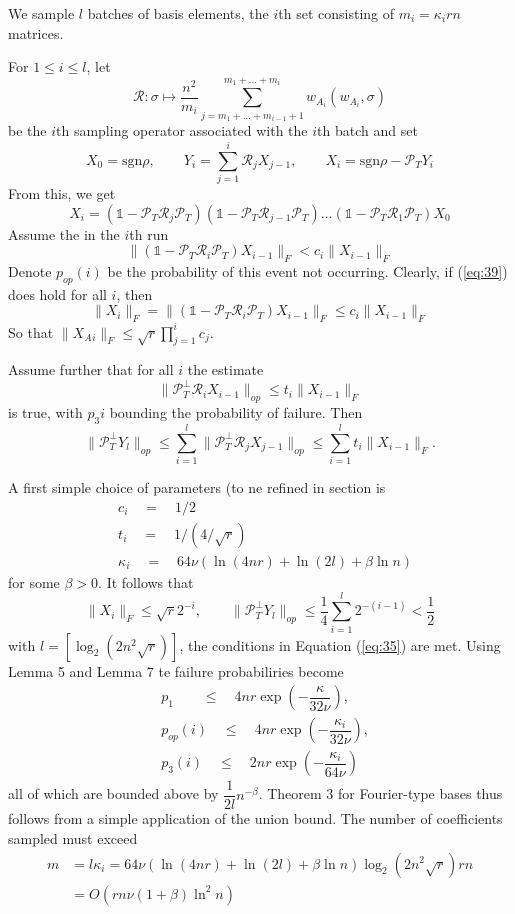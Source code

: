 \documentclass{article}
\begin{document}
We sample $l$ batches of basis elements, the $i$th set consisting of $m_i=\kappa_i rn$ matrices.

For $1\le i \le l$, let
\[
\mathcal{R}: \sigma \mapsto \dfrac{n^2}{m_i}\sum_{j=m_1+\dots+m_{i-1}+1}^{m_1+\dots+m_i} w_{A_i}( w_{A_i},\sigma)
\]
be the $i$th sampling operator associated with the $i$th batch and set
\[
X_0 = \text{sgn}\rho, \qquad Y_i = \sum_{j=1}^i\mathcal{R}_j X_{j-1}, \qquad X_i = \text{sgn}\rho - \mathcal{P}_TY_i
\]
From this, we get
\begin{equation}
X_i = (\mathbb{1}-\mathcal{P}_T\mathcal{R}_j\mathcal{P}_T)(\mathbb{1}-\mathcal{P}_T\mathcal{R}_{j-1}\mathcal{P}_T)\dots(\mathbb{1}-\mathcal{P}_T\mathcal{R}_1\mathcal{P}_T)X_0
\end{equation}
Assume the in the $i$th run
\begin{equation}
\| (\mathbb{1}-\mathcal{P}_T\mathcal{R}_i\mathcal{P}_T) X_{i-1}\|_F < c_i\|X_{i-1}\|_F
\label{eq:39}
\end{equation}
Denote $p_{op}(i)$ be the probability of this event not occurring. Clearly, if (\ref{eq:39}) does hold for all $i$, then
\[
\|X_i\|_F = \|(\mathbb{1}-\mathcal{P}_T\mathcal{R}_i\mathcal{P}_T) X_{i-1}\|_F \le c_i\|X_{i-1}\|_F
\]
So that $\|X_A{_i}\|_F \le \sqrt{r}\prod_{j=1}^i c_j$.

Assume further that for all $i$ the estimate 
\[
\|\mathcal{P}_T^\perp \mathcal{R}_i X_{i-1}\|_{op} \le t_i\|X_{i-1}\|_F
\] 
is true, with $p_3{i}$ bounding the probability of failure.
Then
\[
\|\mathcal{P}_T^\perp Y_l\|_{op} \le \sum_{i=1}^l\|\mathcal{P}_T^\perp \mathcal{R}_j X_{j-1}\|_{op} \le \sum_{i=1}^l t_i \|X_{i-1}\|_F.
\]

A first simple choice of parameters (to ne refined in section \uppercase\expandafter{} is
\begin{align*}
& c_i\quad =\quad 1/2\\
& t_i\quad =\quad 1/(4/\sqrt{r})\\
& \kappa_i\quad = \quad 64\nu(\ln(4nr)+\ln(2l)+\beta \ln n)
\end{align*}
for some $\beta > 0$. It follows that 
\[
\|X_i\|_F \le \sqrt{r}2^{-i}, \qquad \|\mathcal{P}_T^\perp Y_l\|_{op} \le \dfrac{1}{4} \sum_{i=1}^l 2^{-(i-1)} < \dfrac{1}{2}
\]
with $l = [\log_2(2n^2\sqrt{r})]$, the conditions in Equation (\ref{eq:35}) are met. Using Lemma 5 and Lemma 7 te failure probabiliries become
\begin{align*}
&p_1 \qquad \le \quad 4nr \exp \left( -\dfrac{\kappa}{32\nu}\right),\\
&p_{op}(i)\quad \le \quad  4nr \exp \left( -\dfrac{\kappa_i}{32\nu}\right),\\
&p_3(i)\quad \le \quad  2nr \exp \left( -\dfrac{\kappa_i}{64\nu}\right)
\end{align*}
all of which are bounded above by $\dfrac{1}{2l}n^{-\beta}$. Theorem 3 for Fourier-type bases thus follows from a simple application of the union bound. The number of coefficients sampled must exceed
\begin{align*}
m &=l\kappa_i = 64\nu(\ln(4nr)+\ln(2l)+\beta \ln n)\log_2(2n^2\sqrt{r})rn\\
& = O(rn\nu (1+\beta)\ln^2n)
\end{align*}
\end{document}
